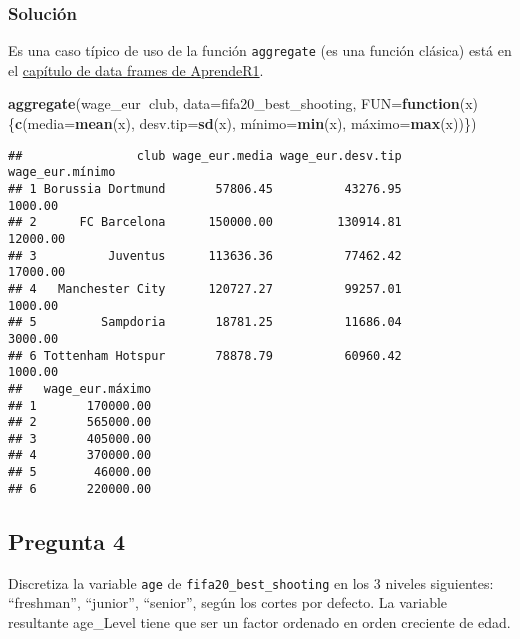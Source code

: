 \documentclass[
]{article}
\newenvironment{Shaded}{\begin{snugshade}}{\end{snugshade}}
\newcommand{\ControlFlowTok}[1]{\textcolor[rgb]{0.13,0.29,0.53}{\textbf{#1}}}
\newcommand{\DataTypeTok}[1]{\textcolor[rgb]{0.13,0.29,0.53}{#1}}
\newcommand{\KeywordTok}[1]{\textcolor[rgb]{0.13,0.29,0.53}{\textbf{#1}}}
\newcommand{\NormalTok}[1]{#1}
\newcommand{\OperatorTok}[1]{\textcolor[rgb]{0.81,0.36,0.00}{\textbf{#1}}}
\begin{document}
\hypertarget{soluciuxf3n-3}{%
\subsubsection{Solución}\label{soluciuxf3n-3}}

Es una caso típico de uso de la función \texttt{aggregate} (es una
función clásica) está en el
\href{https://aprender-uib.github.io/AprendeR1/chap-df.html}{capítulo de
data frames de AprendeR1}.

\begin{Shaded}
\begin{Highlighting}[]
\KeywordTok{aggregate}\NormalTok{(wage_eur}\OperatorTok{~}\NormalTok{club, }\DataTypeTok{data=}\NormalTok{fifa20_best_shooting,}
          \DataTypeTok{FUN=}\ControlFlowTok{function}\NormalTok{(x)\{}\KeywordTok{c}\NormalTok{(}\DataTypeTok{media=}\KeywordTok{mean}\NormalTok{(x),}
                            \DataTypeTok{desv.tip=}\KeywordTok{sd}\NormalTok{(x),}
\NormalTok{                            mí}\DataTypeTok{nimo=}\KeywordTok{min}\NormalTok{(x),}
\NormalTok{                            má}\DataTypeTok{ximo=}\KeywordTok{max}\NormalTok{(x))\})}
\end{Highlighting}
\end{Shaded}

\begin{verbatim}
##                club wage_eur.media wage_eur.desv.tip wage_eur.mínimo
## 1 Borussia Dortmund       57806.45          43276.95         1000.00
## 2      FC Barcelona      150000.00         130914.81        12000.00
## 3          Juventus      113636.36          77462.42        17000.00
## 4   Manchester City      120727.27          99257.01         1000.00
## 5         Sampdoria       18781.25          11686.04         3000.00
## 6 Tottenham Hotspur       78878.79          60960.42         1000.00
##   wage_eur.máximo
## 1       170000.00
## 2       565000.00
## 3       405000.00
## 4       370000.00
## 5        46000.00
## 6       220000.00
\end{verbatim}

\hypertarget{pregunta-4}{%
\subsection{Pregunta 4}\label{pregunta-4}}

Discretiza la variable \texttt{age} de \texttt{fifa20\_best\_shooting}
en los 3 niveles siguientes: ``freshman'', ``junior'', ``senior'', según
los cortes por defecto. La variable resultante age\_Level tiene que ser
un factor ordenado en orden creciente de edad.
\end{document}

